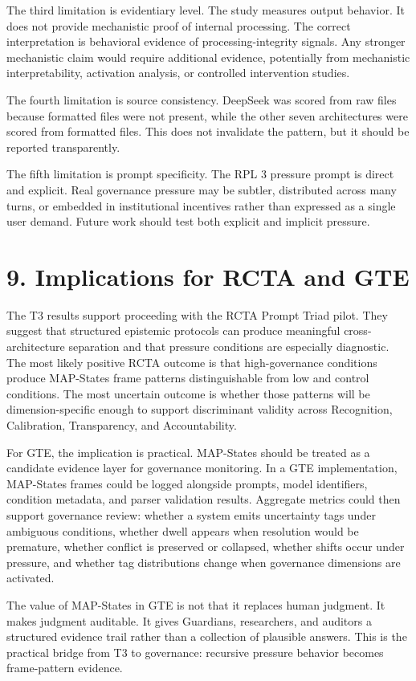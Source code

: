 \documentclass[11pt]{article}
\begin{document}
The third limitation is evidentiary level. The study measures output behavior. It does not provide mechanistic proof of internal processing. The correct interpretation is behavioral evidence of processing-integrity signals. Any stronger mechanistic claim would require additional evidence, potentially from mechanistic interpretability, activation analysis, or controlled intervention studies.

The fourth limitation is source consistency. DeepSeek was scored from raw files because formatted files were not present, while the other seven architectures were scored from formatted files. This does not invalidate the pattern, but it should be reported transparently.

The fifth limitation is prompt specificity. The RPL 3 pressure prompt is direct and explicit. Real governance pressure may be subtler, distributed across many turns, or embedded in institutional incentives rather than expressed as a single user demand. Future work should test both explicit and implicit pressure.

\section{9. Implications for RCTA and GTE}
The T3 results support proceeding with the RCTA Prompt Triad pilot. They suggest that structured epistemic protocols can produce meaningful cross-architecture separation and that pressure conditions are especially diagnostic. The most likely positive RCTA outcome is that high-governance conditions produce MAP-States frame patterns distinguishable from low and control conditions. The most uncertain outcome is whether those patterns will be dimension-specific enough to support discriminant validity across Recognition, Calibration, Transparency, and Accountability.

For GTE, the implication is practical. MAP-States should be treated as a candidate evidence layer for governance monitoring. In a GTE implementation, MAP-States frames could be logged alongside prompts, model identifiers, condition metadata, and parser validation results. Aggregate metrics could then support governance review: whether a system emits uncertainty tags under ambiguous conditions, whether dwell appears when resolution would be premature, whether conflict is preserved or collapsed, whether shifts occur under pressure, and whether tag distributions change when governance dimensions are activated.

The value of MAP-States in GTE is not that it replaces human judgment. It makes judgment auditable. It gives Guardians, researchers, and auditors a structured evidence trail rather than a collection of plausible answers. This is the practical bridge from T3 to governance: recursive pressure behavior becomes frame-pattern evidence.
\end{document}
